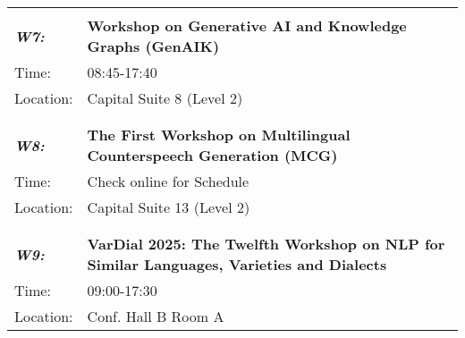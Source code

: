 \begin{longtable}{p{15mm}p{100mm}}
\hline\\
\emph{\textbf{W7:}} & \textbf{Workshop on Generative AI and Knowledge Graphs (GenAIK)} \\
Time: & 08:45-17:40 \\
Location: & Capital Suite 8 (Level 2) \\\\
\hline\\
\emph{\textbf{W8:}} & \textbf{The First Workshop on Multilingual Counterspeech Generation (MCG)} \\
Time: & Check online for Schedule \\
Location: & Capital Suite 13 (Level 2) \\\\
\hline\\
\emph{\textbf{W9:}} & \textbf{VarDial 2025: The Twelfth Workshop on NLP for Similar Languages, Varieties and Dialects} \\
Time: & 09:00-17:30 \\
Location: & Conf. Hall B Room A \\
\end{longtable}

